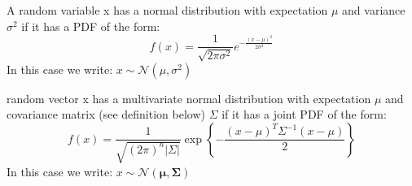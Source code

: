 {\begin{definition}[Univariate Normal Distribution (namely, in dimension $d=1$)] \label{def: UVN}
A random variable x has a normal distribution with expectation $\mu$ and variance $\sigma^2$ if it has a PDF of the form:
$$f(x) = \frac{1}{\sqrt{2\pi\sigma^2} } e^{ -\frac{(x-\mu)^2}{2\sigma^2} } $$
In this case we write: $x\sim\mathcal{N}({\mu},{\sigma^2})$

\end{definition}
\begin{definition} \label{def: MVN}
random vector x has a multivariate normal distribution with expectation $\mu$ and covariance matrix (see definition below) $\Sigma$ if it has a joint PDF of the form:
$$f\left(x\right)=\frac{1}{\sqrt{\left(2\pi\right)^{n}\left|\Sigma\right|}}\exp\left\{ -\frac{\left(x-\mu\right)^{T}\Sigma^{-1}\left(x-\mu\right)}{2}\right\} $$
In this case we write: $x\sim\mathcal{N}(\boldsymbol{\mu},\boldsymbol{\Sigma})$
\end{definition}

}
